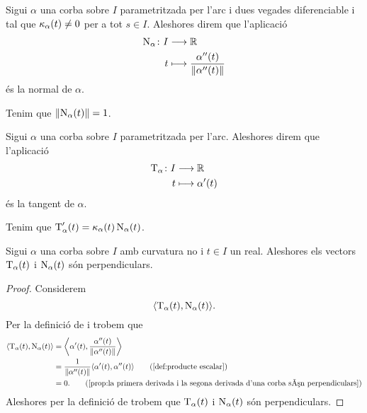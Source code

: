 \documentclass[../Apunts.tex]{subfiles}
\begin{document}
	\begin{definition}[Normal]
		\label{def:normal}
		Sigui \(\alpha\) una corba sobre \(I\) parametritzada per l'arc i dues vegades diferenciable i tal que \(\operatorname{\kappa}_{\alpha}(t)\neq0\) per a tot \(s\in I\). Aleshores direm que l'aplicació
		\begin{align*}
			\normal_{\alpha}\colon I&\longrightarrow\mathbb{R} \\
			t&\longmapsto\frac{\alpha''(t)}{\norm{\alpha''(t)}}
		\end{align*}
		és la normal de \(\alpha\).
	\end{definition}
	\begin{observation}
		\label{obs:la normal a una corba és unitària}
		Tenim que \(\norm{\normal_{\alpha}(t)}=1\).
	\end{observation}
	\begin{definition}[Tangent]
		\label{def:tangent}
		Sigui \(\alpha\) una corba sobre \(I\) parametritzada per l'arc. Aleshores direm que l'aplicació
		\begin{align*}
			\operatorname{T}_{\alpha}\colon I&\longrightarrow\mathbb{R} \\
			t&\longmapsto\alpha'(t)
		\end{align*}
		és la tangent de \(\alpha\).
	\end{definition}
	\begin{observation}
		\label{obs:la derivada de la tangent és la curvatura per la normal}
		Tenim que \(\operatorname{T}_{\alpha}'(t)=\operatorname{\kappa}_{\alpha}(t)\operatorname{N}_{\alpha}(t)\).
	\end{observation}
	\begin{proposition}
		\label{prop:la tangent i la normal d'una corba amb curvatura no nula són perpendiculars}
		Sigui \(\alpha\) una corba sobre \(I\) amb curvatura no \nulla{} i \(t\in I\) un real. Aleshores els vectors \(\operatorname{T}_{\alpha}(t)\) i \(\operatorname{N}_{\alpha}(t)\) són perpendiculars.
		\begin{proof}
			Considerem
			\[\prodesc{\tangent_{\alpha}(t)}{\normal_{\alpha}(t)}.\]
			Per la definició de  i  trobem que
			\begin{align*}
				\prodesc{\tangent_{\alpha}(t)}{\normal_{\alpha}(t)}&=\prodesc[\big]{\alpha'(t)}{\frac{\alpha''(t)}{\norm{\alpha''(t)}}} \\
				&=\frac{1}{\norm{\alpha''(t)}}\prodesc{\alpha'(t)}{\alpha''(t)} \tag{\ref{def:producte escalar}} \\
				&=0. \tag{\ref{prop:la primera derivada i la segona derivada d'una corba són perpendiculars}}
			\end{align*}
			Aleshores per la definició de  trobem que \(\operatorname{T}_{\alpha}(t)\) i \(\operatorname{N}_{\alpha}(t)\) són perpendiculars.
		\end{proof}
	\end{proposition}
\end{document}
